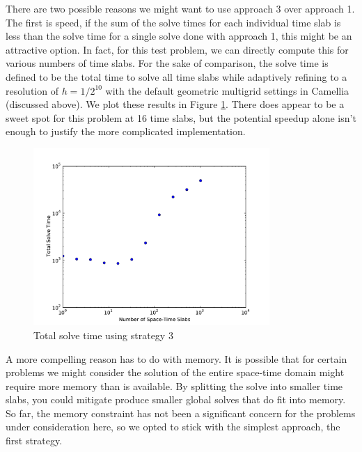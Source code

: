 \documentclass[Dissertation.tex]{subfiles}
\begin{document}
There are two possible reasons we might want to use approach 3 over approach 1.
The first is speed, if the sum of the solve times for each individual time slab is
less than the solve time for a single solve done with approach 1, this might be an
attractive option. In fact, for this test problem, we can directly compute this for
various numbers of time slabs. 
For the sake of comparison, the solve time is defined to be the total time to solve all
time slabs while adaptively refining to a resolution of $h=1/2^{10}$ 
with the default geometric multigrid settings in Camellia (discussed above).
We plot these results in Figure \ref{fig:TimeSlabSolveTime}. 
There does appear to be a sweet spot for this problem at 16 time slabs, but the potential speedup alone isn't 
enough to justify the more complicated implementation.
\begin{figure}
\centering
\includegraphics[width=0.8\textwidth]{Dissertation/Scaling/TimeSlabSolveTime.pdf}
\caption{Total solve time using strategy 3}
\label{fig:TimeSlabSolveTime}
\end{figure}

A more compelling reason has to do with memory. It is possible that for certain problems we might consider
the solution of the entire space-time domain might require more memory than is available.
By splitting the solve into smaller time slabs, you could mitigate produce smaller global solves that do 
fit into memory. So far, the memory constraint has not been a significant concern for the problems under
consideration here, so we opted to stick with the simplest approach, the first strategy.
\end{document}
